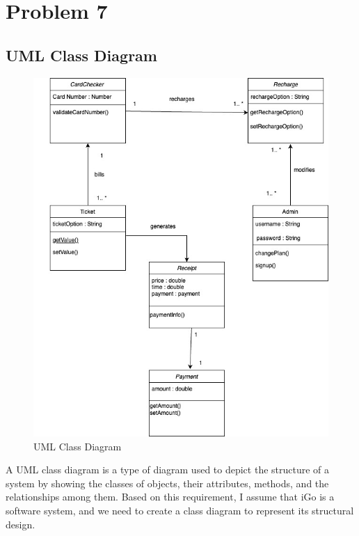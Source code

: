 \documentclass[a4paper, 11pt]{report}
\begin{document}
\chapter{Problem 7}
\renewcommand{\thesection}{7.\arabic{section}} %
\section{UML Class Diagram}
\begin{figure}[h]
    \renewcommand{\thefigure}{7.1.1}
    \centering
    \includegraphics[scale=0.5]{UMLDiagram.jpg}
    \caption{UML Class Diagram}
\end{figure}
\clearpage  
A UML class diagram is a type of diagram used to depict the structure of a system by showing the classes of objects, their attributes, methods, and the relationships among them. Based on this requirement, I assume that iGo is a software system, and we need to create a class diagram to represent its structural design.\\
\end{document}
